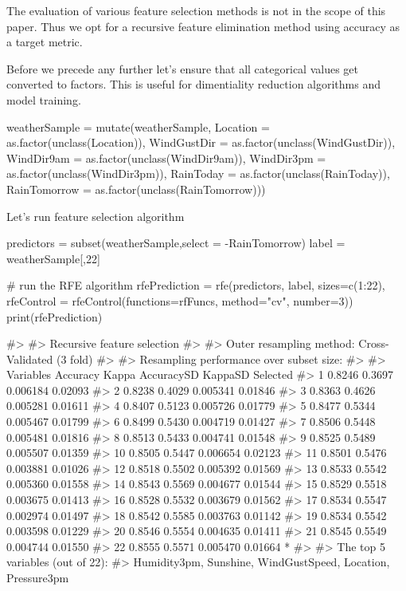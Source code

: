 The evaluation of various feature selection methods is not in the scope
of this paper. Thus we opt for a recursive feature elimination method
using accuracy as a target metric.

Before we precede any further let's ensure that all categorical values
get converted to factors. This is useful for dimentiality reduction
algorithms and model training.

\begin{Schunk}
\begin{Sinput}
weatherSample = mutate(weatherSample, Location = as.factor(unclass(Location)), WindGustDir = as.factor(unclass(WindGustDir)),
              WindDir9am = as.factor(unclass(WindDir9am)), WindDir3pm = as.factor(unclass(WindDir3pm)),
              RainToday = as.factor(unclass(RainToday)), RainTomorrow = as.factor(unclass(RainTomorrow)))
\end{Sinput}
\end{Schunk}

Let's run feature selection algorithm

\begin{Schunk}
\begin{Sinput}
predictors = subset(weatherSample,select = -RainTomorrow)
label = weatherSample[,22]

# run the RFE algorithm
rfePrediction = rfe(predictors, label, sizes=c(1:22), 
                    rfeControl = rfeControl(functions=rfFuncs, method="cv", number=3))
print(rfePrediction)
\end{Sinput}
\begin{Soutput}
#> 
#> Recursive feature selection
#> 
#> Outer resampling method: Cross-Validated (3 fold) 
#> 
#> Resampling performance over subset size:
#> 
#>  Variables Accuracy  Kappa AccuracySD KappaSD Selected
#>          1   0.8246 0.3697   0.006184 0.02093         
#>          2   0.8238 0.4029   0.005341 0.01846         
#>          3   0.8363 0.4626   0.005281 0.01611         
#>          4   0.8407 0.5123   0.005726 0.01779         
#>          5   0.8477 0.5344   0.005467 0.01799         
#>          6   0.8499 0.5430   0.004719 0.01427         
#>          7   0.8506 0.5448   0.005481 0.01816         
#>          8   0.8513 0.5433   0.004741 0.01548         
#>          9   0.8525 0.5489   0.005507 0.01359         
#>         10   0.8505 0.5447   0.006654 0.02123         
#>         11   0.8501 0.5476   0.003881 0.01026         
#>         12   0.8518 0.5502   0.005392 0.01569         
#>         13   0.8533 0.5542   0.005360 0.01558         
#>         14   0.8543 0.5569   0.004677 0.01544         
#>         15   0.8529 0.5518   0.003675 0.01413         
#>         16   0.8528 0.5532   0.003679 0.01562         
#>         17   0.8534 0.5547   0.002974 0.01497         
#>         18   0.8542 0.5585   0.003763 0.01142         
#>         19   0.8534 0.5542   0.003598 0.01229         
#>         20   0.8546 0.5554   0.004635 0.01411         
#>         21   0.8545 0.5549   0.004744 0.01550         
#>         22   0.8555 0.5571   0.005470 0.01664        *
#> 
#> The top 5 variables (out of 22):
#>    Humidity3pm, Sunshine, WindGustSpeed, Location, Pressure3pm
\end{Soutput}
\end{Schunk}

